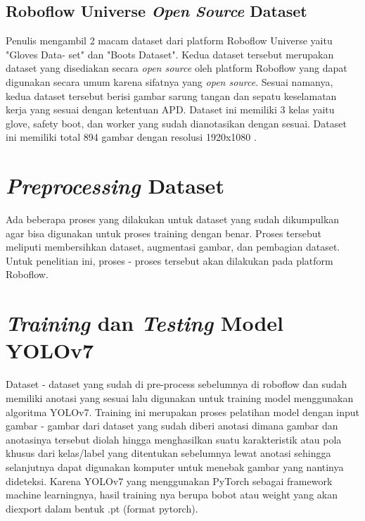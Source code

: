 \subsection{Roboflow Universe \emph{Open Source} Dataset}
\label{roboflowdataset}

Penulis mengambil 2 macam dataset dari platform Roboflow Universe yaitu "Gloves Data- set" dan "Boots Dataset". Kedua dataset tersebut merupakan dataset yang disediakan secara \emph{open source} oleh platform Roboflow yang dapat digunakan secara umum karena sifatnya yang \emph{open source}. Sesuai namanya, kedua dataset tersebut berisi gambar sarung tangan dan sepatu keselamatan kerja yang sesuai dengan ketentuan APD. Dataset ini memiliki 3 kelas yaitu glove, safety boot, dan worker yang sudah dianotasikan dengan sesuai. Dataset ini memiliki total 894 gambar dengan resolusi 1920x1080 \cite{gloves-7zhos_dataset} \cite{boots-uzihq_dataset}.

\section{\textit{Preprocessing} Dataset}
\label{sec:preprocessing}
\par Ada beberapa proses yang dilakukan untuk dataset yang sudah dikumpulkan agar bisa digunakan untuk proses training dengan benar. Proses tersebut meliputi membersihkan dataset, augmentasi gambar, dan pembagian dataset. Untuk penelitian ini, proses - proses tersebut akan dilakukan pada platform Roboflow.

\section{\emph{Training} dan \emph{Testing} Model YOLOv7}
\label{sec:trainingdataset}

\par Dataset - dataset yang sudah di pre-process sebelumnya di roboflow dan sudah memiliki anotasi yang sesuai lalu digunakan untuk training model menggunakan algoritma YOLOv7. Training ini merupakan proses pelatihan model dengan input gambar - gambar dari dataset yang sudah diberi anotasi dimana gambar dan anotasinya tersebut diolah hingga menghasilkan suatu karakteristik atau pola khusus dari kelas/label yang ditentukan sebelumnya lewat anotasi sehingga selanjutnya dapat digunakan komputer untuk menebak gambar yang nantinya dideteksi. Karena YOLOv7 yang menggunakan PyTorch sebagai framework machine learningnya, hasil training nya berupa bobot atau weight yang akan diexport dalam bentuk .pt (format pytorch).

